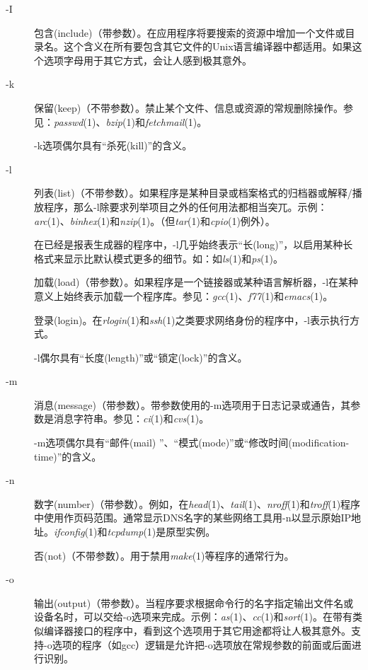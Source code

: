 \documentclass[12pt,oneside]{ctexbook}
\begin{document}
\begin{common-format}
\begin{description}
\item[-I] 包含(include)（带参数）。在应用程序将要搜索的资源中增加一个文件或目录名。这个含义在所有要包含其它文件的Unix语言编译器中都适用。如果这个选项字母用于其它方式，会让人感到极其意外。

\item[-k] 保留(keep)（不带参数）。禁止某个文件、信息或资源的常规删除操作。参见：\textit{passwd}(1)、\textit{bzip}(1)和\textit{fetchmail}(1)。

-k选项偶尔具有“杀死(kill)”的含义。

\item[-l] 列表(list)（不带参数）。如果程序是某种目录或档案格式的归档器或解释/播放程序，那么-l除要求列举项目之外的任何用法都相当突兀。示例：\textit{arc}(1)、\textit{binhex}(1)和\textit{nzip}(1)。（但\textit{tar}(1)和\textit{cpio}(1)例外）。

在已经是报表生成器的程序中，-l几乎始终表示“长(long)”，以启用某种长格式来显示比默认模式更多的细节。如：如\textit{ls}(1)和\textit{ps}(1)。

加载(load)（带参数）。如果程序是一个链接器或某种语言解析器，-l在某种意义上始终表示加载一个程序库。参见：\textit{gcc}(1)、\textit{f77}(1)和\textit{emacs}(1)。

 登录(login)。在\textit{rlogin}(1)和\textit{ssh}(1)之类要求网络身份的程序中，-l表示执行方式。

-l偶尔具有“长度(length)”或“锁定(lock)”的含义。

\item[-m] 消息(message)（带参数）。带参数使用的-m选项用于日志记录或通告，其参数是消息字符串。参见：\textit{ci}(1)和\textit{cvs}(1)。

-m选项偶尔具有“邮件(mail) ”、“模式(mode)”或“修改时间(modification-time)”的含义。

\item[-n] 数字(number)（带参数）。例如，在\textit{head}(1)、\textit{tail}(1)、\textit{nroff}(1)和\textit{troff}(1)程序中使用作页码范围。通常显示DNS名字的某些网络工具用-n以显示原始IP地址。\textit{ifconfig}(1)和\textit{tcpdump}(1)是原型实例。

否(not)（不带参数）。用于禁用\textit{make}(1)等程序的通常行为。

\item[-o] 输出(output)（带参数）。当程序要求根据命令行的名字指定输出文件名或设备名时，可以交给-o选项来完成。示例：\textit{as}(1)、\textit{cc}(1)和\textit{sort}(1)。在带有类似编译器接口的程序中，看到这个选项用于其它用途都将让人极其意外。支持-o选项的程序（如gcc）逻辑是允许把-o选项放在常规参数的前面或后面进行识别。


\end{description}
\end{common-format}
\end{document}
